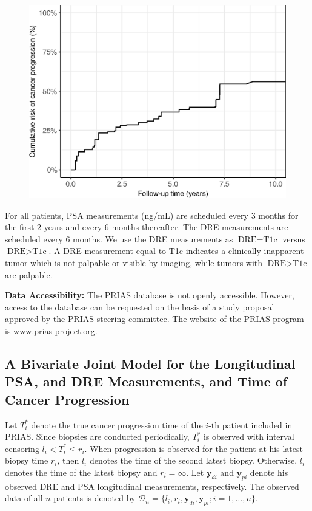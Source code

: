 \documentclass[Afour,sagev,times]{sagej}
\begin{document}


\begin{figure}[!htb]
\captionsetup{justification=justified}
\centerline{\includegraphics[width=\columnwidth]{Figure2.eps}}

\label{Figure2}
\end{figure}

For all patients, PSA measurements (ng/mL) are scheduled every 3 months for the first 2 years and every 6 months thereafter. The DRE measurements are scheduled every 6 months. We use the DRE measurements as ${\mbox{DRE} = \mbox{T1c}}$ versus $\mbox{DRE} > \mbox{T1c}$. A DRE measurement equal to T1c\cite{schroder1992tnm} indicates a clinically inapparent tumor which is not palpable or visible by imaging, while tumors with $\mbox{DRE} > \mbox{T1c}$ are palpable.

\textbf{Data Accessibility:} The PRIAS database is not openly accessible. However, access to the database can be requested on the basis of a study proposal approved by the PRIAS steering committee. The website of the PRIAS program is \url{www.prias-project.org}.

\subsection{A Bivariate Joint Model for the Longitudinal PSA, and DRE Measurements, and Time of Cancer Progression}
Let $T_i^*$ denote the true cancer progression time of the ${i\mbox{-th}}$ patient included in PRIAS. Since biopsies are conducted periodically, $T_i^*$ is observed with interval censoring ${l_i < T_i^* \leq r_i}$. When progression is observed for the patient at his latest biopsy time $r_i$, then $l_i$ denotes the time of the second latest biopsy. Otherwise, $l_i$ denotes the time of the latest biopsy and ${r_i=\infty}$. Let $\boldsymbol{y}_{di}$ and $\boldsymbol{y}_{pi}$ denote his observed DRE and PSA longitudinal measurements, respectively. The observed data of all $n$ patients is denoted by ${\mathcal{D}_n = \{l_i, r_i, \boldsymbol{y}_{di}, \boldsymbol{y}_{pi}; i = 1, \ldots, n\}}$.
\end{document}
